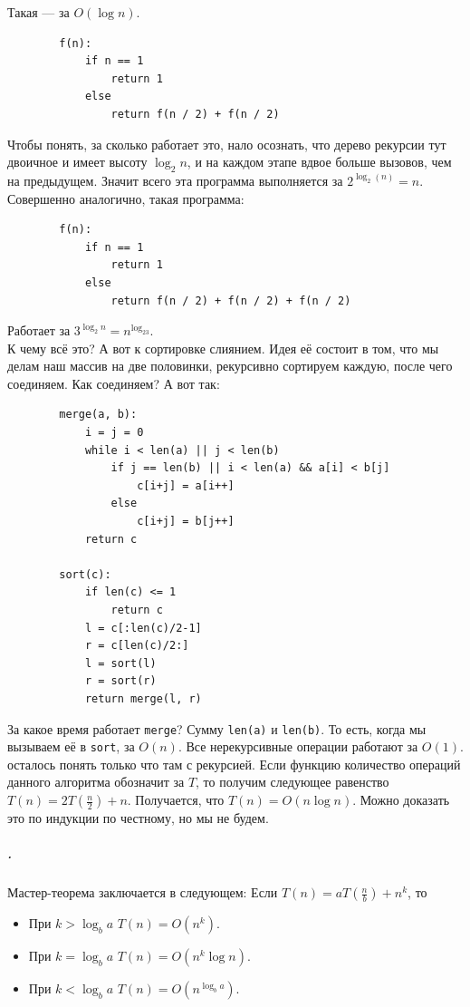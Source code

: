 \documentclass{article}
\newcommand{\pseudo}{PseudoLexer.py:PseudoLexer -x}
\newcommand{\pseudocode}[1]{\texttt{#1}}
\begin{document}
    Такая --- за $O(\log n)$.
    \begin{verbatim}
        f(n):
            if n == 1
                return 1
            else
                return f(n / 2) + f(n / 2)
    \end{verbatim}
    Чтобы понять, за сколько работает это, нало осознать, что дерево рекурсии тут двоичное и имеет высоту $\log_2n$, и на каждом этапе вдвое больше вызовов, чем на предыдущем. Значит всего эта программа выполняется за $2^{\log_2(n)}=n$. Совершенно аналогично, такая программа:
    \begin{verbatim}
        f(n):
            if n == 1
                return 1
            else
                return f(n / 2) + f(n / 2) + f(n / 2)
    \end{verbatim}
    Работает за $3^{\log_2n}=n^{\log_23}$.\\
    К чему всё это? А вот к сортировке слиянием. Идея её состоит в том, что мы делам наш массив на две половинки, рекурсивно сортируем каждую, после чего соединяем. Как соединяем? А вот так:
    \begin{verbatim}
        merge(a, b):
            i = j = 0
            while i < len(a) || j < len(b)
                if j == len(b) || i < len(a) && a[i] < b[j]
                    c[i+j] = a[i++]
                else
                    c[i+j] = b[j++]
            return c

        sort(c):
            if len(c) <= 1
                return c
            l = c[:len(c)/2-1]
            r = c[len(c)/2:]
            l = sort(l)
            r = sort(r)
            return merge(l, r)
    \end{verbatim}
    За какое время работает \pseudocode{merge}? Сумму \pseudocode{len(a)} и \pseudocode{len(b)}. То есть, когда мы вызываем её в \pseudocode{sort}, за $O(n)$. Все нерекурсивные операции работают за $O(1)$. осталось понять только что там с рекурсией. Если функцию количество операций данного алгоритма обозначит за $T$, то получим следующее равенство $T(n)=2T(\frac n2)+n$. Получается, что $T(n)=O(n\log n)$. Можно доказать это по индукции по честному, но мы не будем.
    \subparagraph{.}
    Мастер-теорема заключается в следующем: Если $T(n)=aT\left(\frac nb\right)+n^k$, то
    \begin{itemize}
        \item При $k>\log_ba$ $T(n)=O(n^k)$.
        \item При $k=\log_ba$ $T(n)=O(n^k\log n)$.
        \item При $k<\log_ba$ $T(n)=O(n^{\log_ba})$.
    \end{itemize}
\end{document}
